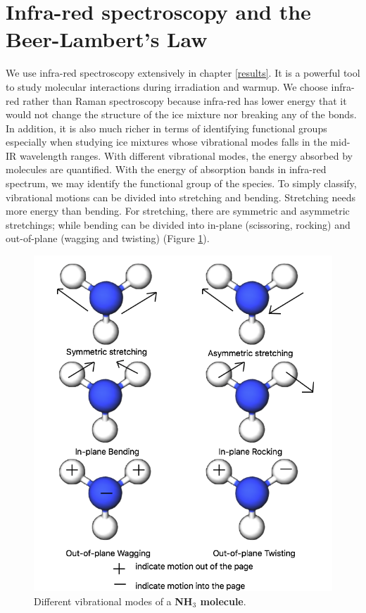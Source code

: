 \section{Infra-red spectroscopy and the Beer-Lambert’s Law}
\label{sec:spectroscopy}
We use infra-red spectroscopy extensively in chapter \ref{results}. It is a powerful tool to study molecular interactions during irradiation and warmup. We choose infra-red rather than Raman spectroscopy because infra-red has lower energy that it would not change the structure of the ice mixture nor breaking any of the bonds. In addition, it is also much richer in terms of identifying functional groups especially when studying ice mixtures whose vibrational modes falls in the mid-IR wavelength ranges. With different vibrational modes, the energy absorbed by molecules are quantified. With the energy of absorption bands in infra-red spectrum, we may identify the functional group of the species. To simply classify, vibrational motions can be divided into stretching and bending. Stretching needs more energy than bending. For stretching, there are symmetric and asymmetric stretchings; while bending can be divided into in-plane (scissoring, rocking) and out-of-plane (wagging and twisting) (Figure \ref{fig:vibration}).
\begin{figure}
\centering
\includegraphics[width=\textwidth]{figures/chapter2/vibration.png}
\caption{Different vibrational modes of a \textbf{NH$_3$ molecule}.}
\label{fig:vibration}
\end{figure}

